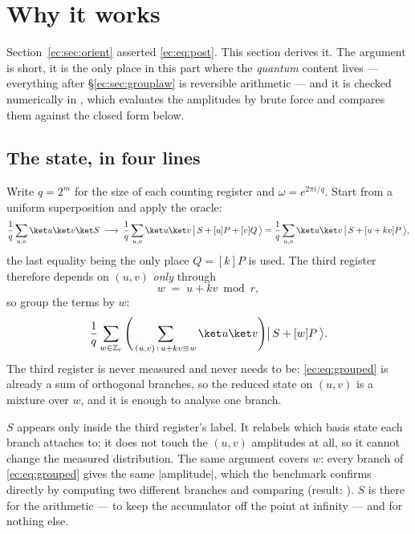 \section{Why it works}\label{ec:sec:why}

Section~\ref{ec:sec:orient} asserted \eqref{ec:eq:post}. This section derives it. The argument is
short, it is the only place in this part where the \emph{quantum} content lives --- everything after
\S\ref{ec:sec:grouplaw} is reversible arithmetic --- and it is checked numerically in
, which evaluates the amplitudes by brute force and compares them
against the closed form below.

\subsection{The state, in four lines}

Write $q=2^m$ for the size of each counting register and $\omega=e^{2\pi i/q}$. Start from a uniform
superposition and apply the oracle:
\[
\frac1q\sum_{u,v}\ket u\ket v\ket S
\;\longrightarrow\;
\frac1q\sum_{u,v}\ket u\ket v\,\big|\,S+[u]P+[v]Q\,\big\rangle
=\frac1q\sum_{u,v}\ket u\ket v\,\big|\,S+[u+kv]P\,\big\rangle ,
\]
the last equality being the only place $Q=[k]P$ is used. The third register therefore depends on
$(u,v)$ \emph{only} through
\[
w \;=\; u+kv \bmod r ,
\]
so group the terms by $w$:
\begin{equation}\label{ec:eq:grouped}
\frac1q\sum_{w\in\mathbb{Z}_r}\Bigg(\sum_{(u,v)\,:\,u+kv\equiv w}\ket u\ket v\Bigg)\big|\,S+[w]P\,\big\rangle .
\end{equation}
The third register is never measured and never needs to be: \eqref{ec:eq:grouped} is already a sum
of orthogonal branches, so the reduced state on $(u,v)$ is a mixture over $w$, and it is enough to
analyse one branch.

\begin{keybox}[title={Why the offset $S$ cannot matter}]
$S$ appears only inside the third register's label. It relabels which basis state each branch
attaches to; it does not touch the $(u,v)$ amplitudes at all, so it cannot change the measured
distribution. The same argument covers $w$: every branch of \eqref{ec:eq:grouped} gives the same
$|$amplitude$|$, which the benchmark confirms directly by computing two different branches and
comparing (result: ). $S$ is there for the arithmetic --- to keep the
accumulator off the point at infinity --- and for nothing else.
\end{keybox}

